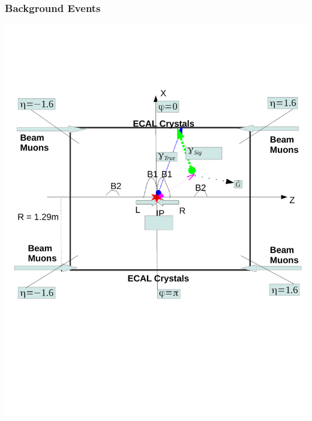 \documentclass{beamer}
\begin{document}
\begin{frame}
\frametitle{Background Events}
  \begin{minipage}[t]{0.8\linewidth}
   \includegraphics[width=\textwidth]{THESISPLOTS/Background_Delayed_Photon.pdf}
  \end{minipage}
\end{frame}
\end{document}
